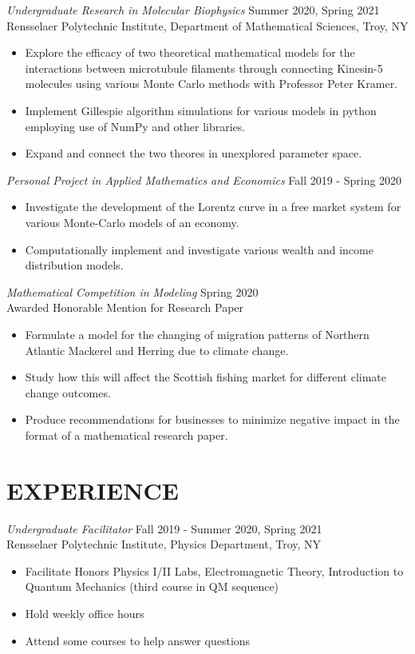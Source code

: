 \documentclass[margin]{rpires}
\begin{document}
\begin{resume}
    {\sl Undergraduate Research in Molecular Biophysics} \hfill Summer 2020, Spring 2021 \\
    Rensselaer Polytechnic Institute, 
    Department of Mathematical Sciences, Troy, NY 
    \begin{itemize}  \itemsep -2pt %
    \item Explore the efficacy of two theoretical mathematical models for the interactions between microtubule filaments through connecting
    Kinesin-5 molecules using various Monte Carlo methods with Professor Peter Kramer.
    \item Implement Gillespie algorithm simulations for various models in python employing use of NumPy and other libraries. 
    \item   Expand and connect the two theores in unexplored parameter space.
    \end{itemize}

    {\sl Personal Project in Applied Mathematics and Economics} \hfill Fall 2019 - Spring 2020
    \begin{itemize}  \itemsep -2pt %
        \item Investigate the development of the Lorentz curve in a free market system for various Monte-Carlo models of an economy.
        \item Computationally implement and investigate various wealth and income distribution models.
    \end{itemize}

    {\sl Mathematical Competition in Modeling} \hfill Spring 2020 \\
    Awarded Honorable Mention for Research Paper
    \begin{itemize}  \itemsep -2pt %
        \item Formulate a model for the changing of migration patterns of Northern Atlantic Mackerel and Herring due to climate change.
        \item Study how this will affect the Scottish fishing market for different climate change outcomes.
        \item Produce recommendations for businesses to minimize negative impact in the format of a mathematical research paper.
    \end{itemize}
\newpage
\section{EXPERIENCE}
    {\sl Undergraduate Facilitator} \hfill Fall 2019 - Summer 2020, Spring 2021 \\
    Rensselaer Polytechnic Institute, Physics Department, Troy, NY
    \begin{itemize}  \itemsep -2pt %
        \item Facilitate Honors Physics I/II Labs, Electromagnetic Theory, Introduction to Quantum Mechanics (third course in QM sequence)
        \item Hold weekly office hours
        \item Attend some courses to help answer questions
    \end{itemize}


\end{resume}
\end{document}
